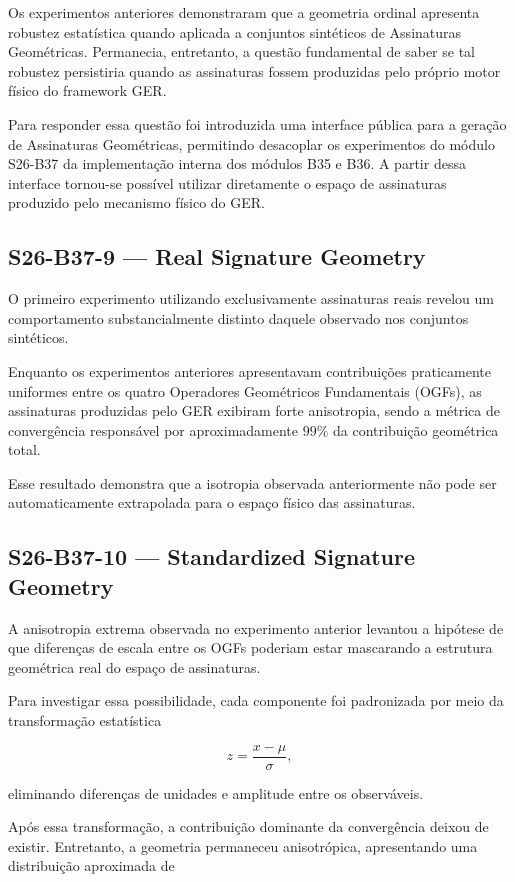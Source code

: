 \documentclass[11pt,a4paper]{article}
\begin{document}
Os experimentos anteriores demonstraram que a geometria ordinal apresenta
robustez estatística quando aplicada a conjuntos sintéticos de Assinaturas
Geométricas. Permanecia, entretanto, a questão fundamental de saber se tal
robustez persistiria quando as assinaturas fossem produzidas pelo próprio
motor físico do framework GER.

Para responder essa questão foi introduzida uma interface pública para a
geração de Assinaturas Geométricas, permitindo desacoplar os experimentos
do módulo S26-B37 da implementação interna dos módulos B35 e B36.
A partir dessa interface tornou-se possível utilizar diretamente o espaço
de assinaturas produzido pelo mecanismo físico do GER.

\subsection{S26-B37-9 --- Real Signature Geometry}

O primeiro experimento utilizando exclusivamente assinaturas reais revelou
um comportamento substancialmente distinto daquele observado nos conjuntos
sintéticos.

Enquanto os experimentos anteriores apresentavam contribuições praticamente
uniformes entre os quatro Operadores Geométricos Fundamentais (OGFs), as
assinaturas produzidas pelo GER exibiram forte anisotropia, sendo a métrica
de convergência responsável por aproximadamente $99\%$ da contribuição
geométrica total.

Esse resultado demonstra que a isotropia observada anteriormente não pode
ser automaticamente extrapolada para o espaço físico das assinaturas.

\subsection{S26-B37-10 --- Standardized Signature Geometry}

A anisotropia extrema observada no experimento anterior levantou a hipótese
de que diferenças de escala entre os OGFs poderiam estar mascarando a
estrutura geométrica real do espaço de assinaturas.

Para investigar essa possibilidade, cada componente foi padronizada por
meio da transformação estatística

\[
z=\frac{x-\mu}{\sigma},
\]

eliminando diferenças de unidades e amplitude entre os observáveis.

Após essa transformação, a contribuição dominante da convergência deixou de
existir. Entretanto, a geometria permaneceu anisotrópica, apresentando uma
distribuição aproximada de
\end{document}
